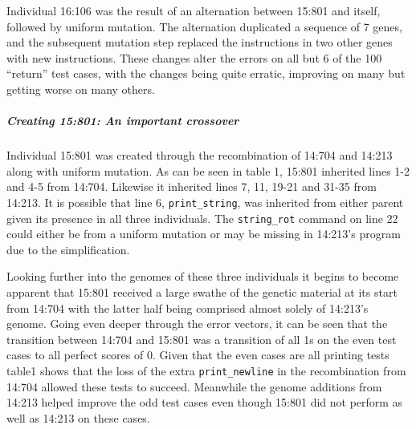 Individual 16:106 was the result of an alternation between 15:801 and itself,
followed by uniform mutation. The alternation duplicated a sequence of 7 genes,
and the subsequent mutation step replaced the instructions in two other 
genes with new instructions. These changes alter the errors on all but 6 of
the 100 ``return'' test cases, with the changes being quite erratic, improving
on many but getting worse on many others.

\subparagraph{Creating 15:801: An important crossover}
\label{sec:15:801}
Individual 15:801 was created through the recombination of 14:704 and 14:213
along with uniform mutation. As can be seen in table 1, 15:801 inherited 
lines 1-2 and 4-5 from 14:704. Likewise it inherited lines 7, 11, 19-21 and 31-35
from 14:213. It is possible that line 6, \texttt{print\_string}, was inherited from either
parent given its presence in all three individuals. The \texttt{string\_rot} command on line
22 could either be from a uniform mutation or may be missing in 14:213's program due to the
simplification.

Looking further into the genomes of these three individuals it begins to become apparent that
15:801 received a large swathe of the genetic material at its start from 14:704 with the latter
half being comprised almost solely of 14:213's genome. Going even deeper through the error vectors,
it can be seen that the transition between 14:704 and 15:801 was a transition of all 1s on the even
test cases to all perfect scores of 0. Given that the even cases are all printing tests table1 shows
that the loss of the extra \texttt{print\_newline} in the recombination from 14:704 allowed these
tests to succeed. Meanwhile the genome additions from 14:213 helped improve the odd test cases even
though 15:801 did not perform as well as 14:213 on these cases.


